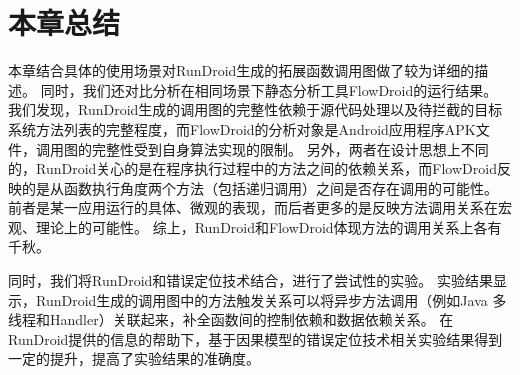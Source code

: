 	



\section{本章总结}
	



本章结合具体的使用场景对RunDroid生成的拓展函数调用图做了较为详细的描述。
同时，我们还对比分析在相同场景下静态分析工具FlowDroid的运行结果。
我们发现，RunDroid生成的调用图的完整性依赖于源代码处理以及待拦截的目标系统方法列表的完整程度，而FlowDroid的分析对象是Android应用程序APK文件，调用图的完整性受到自身算法实现的限制。
另外，两者在设计思想上不同的，RunDroid关心的是在程序执行过程中的方法之间的依赖关系，而FlowDroid反映的是从函数执行角度两个方法（包括递归调用）之间是否存在调用的可能性。
前者是某一应用运行的具体、微观的表现，而后者更多的是反映方法调用关系在宏观、理论上的可能性。
综上，RunDroid和FlowDroid体现方法的调用关系上各有千秋。

同时，我们将RunDroid和错误定位技术结合，进行了尝试性的实验。
实验结果显示，RunDroid生成的调用图中的方法触发关系可以将异步方法调用（例如Java 多线程和Handler）关联起来，补全函数间的控制依赖和数据依赖关系。
在RunDroid提供的信息的帮助下，基于因果模型的错误定位技术相关实验结果得到一定的提升，提高了实验结果的准确度。